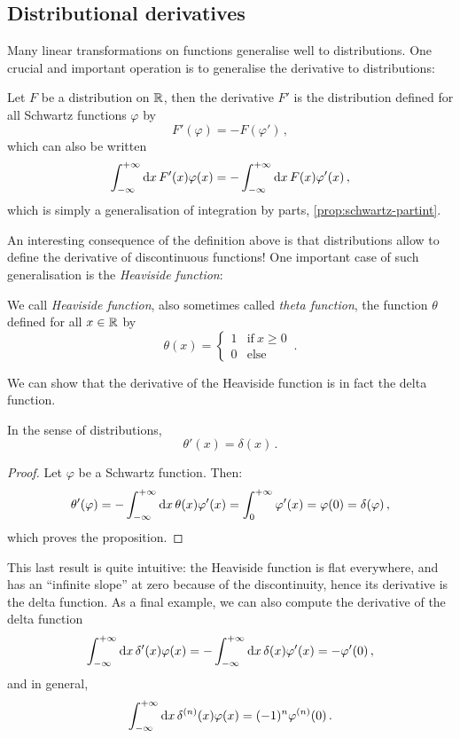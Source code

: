 \subsection{Distributional derivatives}
Many linear transformations on functions generalise well to distributions. One crucial and
important operation is to generalise the derivative to distributions:
\begin{definition}
  Let $F$ be a distribution on $\mathbb{R}$, then the derivative $F'$ is the distribution defined
  for all Schwartz functions $\varphi$ by
  \begin{equation}
    F'(\varphi)=-F(\varphi')\,,
  \end{equation}
  which can also be written
  \begin{equation}
    \int_{-\infty}^{+\infty}\mathrm{d}{x}\,F'(x)\varphi(x)=-\int_{-\infty}^{+\infty}\mathrm{d}{x}\,F(x)\varphi'(x)\,,
  \end{equation}
  which is simply a generalisation of integration by parts,
  \cf\cref{prop:schwartz-partint}.
\end{definition}
An interesting consequence of the definition above is that distributions allow to define
the derivative of discontinuous functions! One important case of such generalisation is
the \emph{Heaviside function}:
\begin{definition}
  We call \emph{Heaviside function}, also sometimes called \emph{theta function}, the
  function $\theta$ defined for all $x\in\mathbb{R}$ by
  \begin{equation}
    \theta(x)=
    \begin{cases}
      1&\text{if}~x\geq 0\\
      0&\text{else}
    \end{cases}\,.
  \end{equation}
\end{definition}
We can show that the derivative of the Heaviside function is in fact the delta function.
\begin{proposition}
  In the sense of distributions,
  \begin{equation}
    \theta'(x)=\delta(x)\,.
  \end{equation}
\end{proposition}
\begin{proof}
  Let $\varphi$ be a Schwartz function. Then:
  \begin{equation}
    \theta'(\varphi)=-\int_{-\infty}^{+\infty}\mathrm{d}{x}\,\theta(x)\varphi'(x)=\int_0^{+\infty}\varphi'(x)
    =\varphi(0)=\delta(\varphi)\,,
  \end{equation}
  which proves the proposition.
\end{proof}
This last result is quite intuitive: the Heaviside function is flat everywhere, and has an
``infinite slope'' at zero because of the discontinuity, hence its derivative is the delta
function. As a final example, we can also compute the derivative of the delta function
\begin{equation}
  \int_{-\infty}^{+\infty}\mathrm{d}{x}\,\delta'(x)\varphi(x)=-\int_{-\infty}^{+\infty}\mathrm{d}{x}\,\delta(x)\varphi'(x)=-\varphi'(0)\,,
\end{equation}
and in general,
\begin{equation}
  \int_{-\infty}^{+\infty}\mathrm{d}{x}\,\delta^{(n)}(x)\varphi(x)=(-1)^n\varphi^{(n)}(0)\,.
\end{equation}
